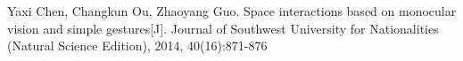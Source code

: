 
\begin{cventries}
  \cventry
    {}
    {}
    {}
    {}
    {
      \begin{cvitems}
		\item Yaxi Chen, Changkun Ou, Zhaoyang Guo. Space interactions based on monocular vision and simple gestures[J]. Journal of Southwest University for Nationalities (Natural Science Edition), 2014, 40(16):871-876
	  \end{cvitems}
    }
\end{cventries}
